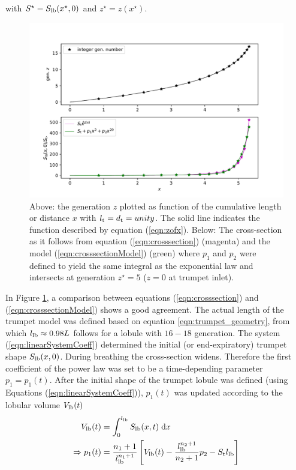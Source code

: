with $S^\star = S_{\mathrm{lb}}(x^\star, 0)$ and $z^\star = z(x^\star)$.

\begin{figure}[tb!]
  \centering
  \includegraphics[width=1.0\textwidth]{figures/trumpet_geometry}
  \caption{Above: the generation $z$ plotted as function of the cumulative length or distance $x$ with $l_{\mathrm{t}} = d_{\mathrm{t}} = unity$. The solid line indicates the function described by equation (\ref{eqn:zofx}). Below: The cross-section as it follows from equation (\ref{eqn:crosssection}) (magenta) and the model (\ref{eqn:crosssectionModel}) (green) where $p_1$ and $p_2$ were defined to yield the same integral as the exponential law and intersects at generation $z^\star = 5$ ($z = 0$ at trumpet inlet).}
  \label{fig:trumpet_geometry}
\end{figure}

In Figure \ref{fig:trumpet_geometry}, a comparison between equations (\ref{eqn:crosssection}) and (\ref{eqn:crosssectionModel}) shows a good agreement.
The actual length of the trumpet model was defined based on equation \ref{eqn:trumpet_geometry}, from which $l_{\mathrm{lb}}\approx0.98 L$ follows for a lobule with $16-18$ generation.
The system (\ref{eqn:linearSystemCoeff}) determined the initial (or end-expiratory) trumpet shape $S_{\mathrm{lb}}(x,0)$.
During breathing the cross-section widens.
Therefore the first coefficient of the power law was set to be a time-depending parameter $p_1 = p_1(t)$.
After the initial shape of the trumpet lobule was defined (using Equations (\ref{eqn:linearSystemCoeff})), $p_1(t)$ was updated according to the lobular volume $V_{\mathrm{lb}}(t)$
\begin{align}
  V_{\mathrm{lb}}(t) &= \int_0^{l_{\mathrm{lb}}} S_{\mathrm{lb}}(x,t)\;\mathrm{d} x \\
  \Rightarrow p_1(t) &= \frac{n_1+1}{l_{\mathrm{lb}}^{n_1+1}} \left[ V_{\mathrm{lb}}(t) - \frac{l_{\mathrm{lb}}^{n_2+1}}{n_2 + 1} p_2 - S_{\mathrm{t}} l_{\mathrm{lb}}\right] \label{eqn:shapeParameter}
\end{align}

